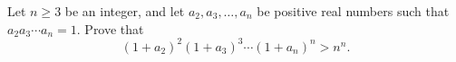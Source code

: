 Let $n\ge 3$ be an integer, and let $a_2,a_3,\ldots ,a_n$ be positive real numbers such that $a_{2}a_{3}\cdots a_{n}=1$. Prove that\[(1 + a_2)^2 (1 + a_3)^3 \dotsm (1 + a_n)^n > n^n.\]